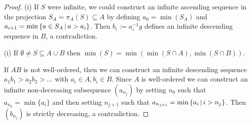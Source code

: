 \begin{proof}
    (i) If $S$ were infinite, we could construct an infinite ascending sequence in the projection $S_A = \pi_A(S) \subseteq A$ by defining $a_0 = \min(S_A)$ and $a_{i+1} = \min \left\{ a \in S_A \,\middle|\, a > a_i \right\}$.
    Then $b_i := a_i^{-1} g$ defines an infinite descending sequence in $B$, a contradiction.

    (i) If $\emptyset \neq S \subseteq A \cup B$ then $\min(S) = \min(\min(S \cap A), \min(S \cap B))$.

    If $AB$ is not well-ordered, then we can construct an infinite descending sequence $a_1 b_1 > a_2 b_2 > \dots$ with $a_i \in A, b_i \in B$.
    Since $A$ is well-ordered we can construct an infinite non-decreasing subsequence $(a_{n_j})$ by setting $n_0$ such that $a_{n_0} = \min \{ a_i \}$ and then setting $n_{j+1}$ such that $a_{n_{j+1}} = \min \left\{ a_i \,\middle|\, i > n_j \right\}$.
    Then $(b_{n_j})$ is strictly decreasing, a contradiction.
\end{proof}

